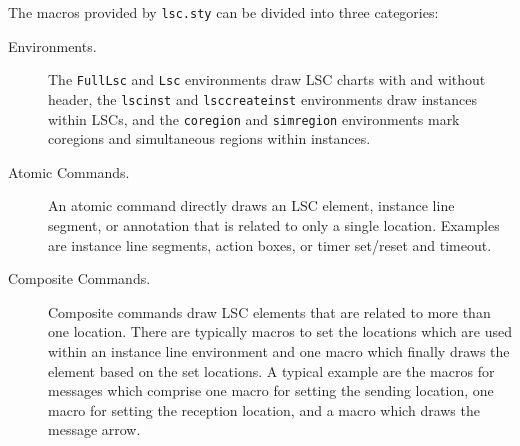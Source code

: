 \documentclass{article}
\newcommand{\env}[1]{\texttt{#1}}
\newcommand{\sty}[1]{\texttt{#1.sty}}
\newcommand{\lscsty}{\sty{lsc}}
\newcommand{\mFullLsc}{\env{FullLsc}}
\newcommand{\mLsc}{\env{Lsc}}
\newcommand{\mcoregion}{\env{coregion}}
\newcommand{\mlsccreateinst}{\env{lsccreateinst}}
\newcommand{\mlscinst}{\env{lscinst}}
\newcommand{\msimregion}{\env{simregion}}
\begin{document}
The macros provided by \lscsty{} can be divided into three 
categories:
%
\begin{description}
\item[Environments.]
  The \mFullLsc{} and \mLsc{} environments draw LSC charts with and without
  header, the \mlscinst{} and \mlsccreateinst{} environments draw instances
  within LSCs, and the \mcoregion{} and \msimregion{} environments mark
  coregions and simultaneous regions within instances.
\item[Atomic Commands.]
  An atomic command directly draws an LSC element, instance line segment, or
  annotation that is related to only a single location.
  Examples are instance line segments, action boxes, or timer set/reset and
  timeout.
\item[Composite Commands.]
  Composite commands draw LSC elements that are related to more than one
  location.  There are typically macros to set the locations which are used
  within an instance line environment and one macro which finally draws the
  element based on the set locations.
  A typical example are the macros for messages which comprise one macro for
  setting the sending location, one macro for setting the reception location,
  and a macro which draws the message arrow.
\end{description}
\end{document}
